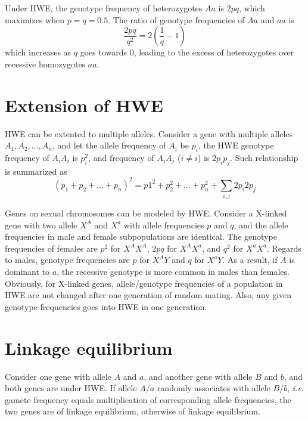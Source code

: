 \documentclass[11pt]{article}
\begin{document}
\begin{sloppypar}
\par

Under HWE, the genotype frequency of heterozygotes $Aa$ is $2pq$, which maximizes when $p=q=0.5$. 
The ratio of genotype frequencies of $Aa$ and $aa$ is 
\begin{equation}
  \frac{2pq}{q^2}=2(\frac{1}{q}-1)
\end{equation}
which increases as $q$ goes towards 0, leading to the excess of heterozygotes over recessive homozygotes $aa$. 

\section{Extension of HWE}
HWE can be extented to multiple alleles. 
Consider a gene with multiple alleles $A_1,A_2,\dots,A_n$, and let the allele frequency of $A_i$ be $p_i$, 
the HWE genotype frequency of $A_iA_i$ is $p_i^2$, and frequency of $A_iA_j$ ($i \neq i$) is $2p_ip_j$. 
Such relationship is summarized as 
\begin{equation}
  (p_1+p_2+\dots+p_n)^2=p1^2+p_2^2+\dots+p_n^2+\sum_{i,j}2p_i2p_j
\end{equation}

\par

Genes on sexual chromosomes can be modeled by HWE. 
Consider a X-linked gene with two allele $X^A$ and $X^a$ with allele frequencies $p$ and $q$, and the allele frequencies in male and female subpopulations are identical. 
The genotype frequencies of females are $p^2$ for $X^AX^A$, $2pq$ for $X^AX^a$, and $q^2$ for $X^aX^a$. 
Regards to males, genotype frequencies are $p$ for $X^AY$ and $q$ for $X^aY$. 
As a result, if $A$ is dominant to $a$, the recessive genotype is more common in males than females. 
Obviously, for X-linked genes, allele/genotype frequencies of a population in HWE are not changed after one generation of random mating. 
Also, any given genotype frequencies goes into HWE in one generation.

\section{Linkage equilibrium}
Consider one gene with allele $A$ and $a$, and another gene with allele $B$ and $b$, and both genes are under HWE. 
If allele $A/a$ randomly associates with allele $B/b$, \textit{i.e.} gamete frequency equals multiplication of corresponding allele frequencies, the two genes are of linkage equilibrium, otherwise of linkage equilibrium. 


\end{sloppypar}
\end{document}
